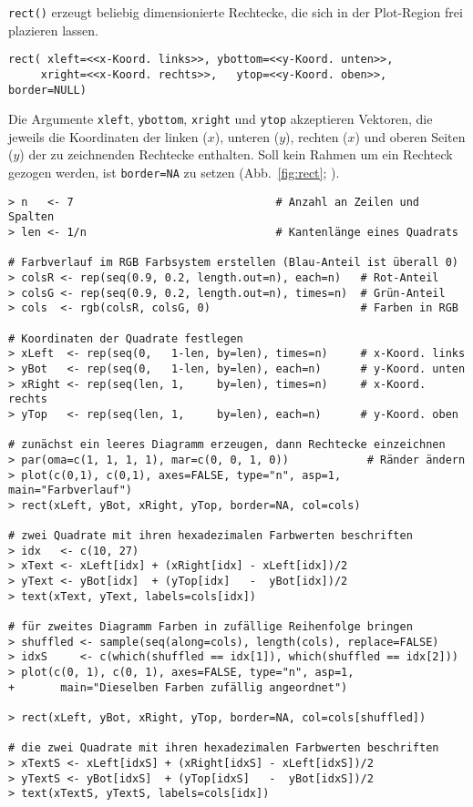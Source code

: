 \lstinline!rect()! erzeugt beliebig dimensionierte Rechtecke, die sich in der Plot-Region frei plazieren lassen.
\begin{lstlisting}
rect( xleft=<<x-Koord. links>>, ybottom=<<y-Koord. unten>>,
     xright=<<x-Koord. rechts>>,   ytop=<<y-Koord. oben>>, border=NULL)
\end{lstlisting}

Die Argumente \lstinline!xleft!, \lstinline!ybottom!, \lstinline!xright! und \lstinline!ytop! akzeptieren Vektoren, die jeweils die Koordinaten der linken ($x$), unteren ($y$), rechten ($x$) und oberen Seiten ($y$) der zu zeichnenden Rechtecke enthalten. Soll kein Rahmen um ein Rechteck gezogen werden, ist \lstinline!border=NA! zu setzen (Abb.\ \ref{fig:rect}; ).
\begin{lstlisting}
> n   <- 7                               # Anzahl an Zeilen und Spalten
> len <- 1/n                             # Kantenlänge eines Quadrats

# Farbverlauf im RGB Farbsystem erstellen (Blau-Anteil ist überall 0)
> colsR <- rep(seq(0.9, 0.2, length.out=n), each=n)   # Rot-Anteil
> colsG <- rep(seq(0.9, 0.2, length.out=n), times=n)  # Grün-Anteil
> cols  <- rgb(colsR, colsG, 0)                       # Farben in RGB

# Koordinaten der Quadrate festlegen
> xLeft  <- rep(seq(0,   1-len, by=len), times=n)     # x-Koord. links
> yBot   <- rep(seq(0,   1-len, by=len), each=n)      # y-Koord. unten
> xRight <- rep(seq(len, 1,     by=len), times=n)     # x-Koord. rechts
> yTop   <- rep(seq(len, 1,     by=len), each=n)      # y-Koord. oben

# zunächst ein leeres Diagramm erzeugen, dann Rechtecke einzeichnen
> par(oma=c(1, 1, 1, 1), mar=c(0, 0, 1, 0))            # Ränder ändern
> plot(c(0,1), c(0,1), axes=FALSE, type="n", asp=1, main="Farbverlauf")
> rect(xLeft, yBot, xRight, yTop, border=NA, col=cols)

# zwei Quadrate mit ihren hexadezimalen Farbwerten beschriften
> idx   <- c(10, 27)
> xText <- xLeft[idx] + (xRight[idx] - xLeft[idx])/2
> yText <- yBot[idx]  + (yTop[idx]   -  yBot[idx])/2
> text(xText, yText, labels=cols[idx])

# für zweites Diagramm Farben in zufällige Reihenfolge bringen
> shuffled <- sample(seq(along=cols), length(cols), replace=FALSE)
> idxS     <- c(which(shuffled == idx[1]), which(shuffled == idx[2]))
> plot(c(0, 1), c(0, 1), axes=FALSE, type="n", asp=1,
+       main="Dieselben Farben zufällig angeordnet")

> rect(xLeft, yBot, xRight, yTop, border=NA, col=cols[shuffled])

# die zwei Quadrate mit ihren hexadezimalen Farbwerten beschriften
> xTextS <- xLeft[idxS] + (xRight[idxS] - xLeft[idxS])/2
> yTextS <- yBot[idxS]  + (yTop[idxS]   -  yBot[idxS])/2
> text(xTextS, yTextS, labels=cols[idx])
\end{lstlisting}

